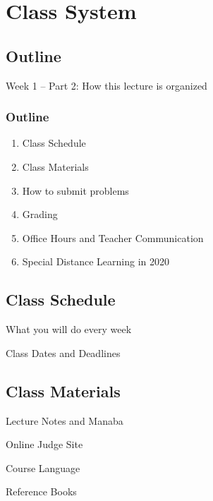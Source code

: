 
\section{Class System}
\subsection{Outline}

\begin{frame}
  \centering
  {\huge
    Week 1 -- Part 2: How this lecture is organized
  }
\end{frame}

\begin{frame}
  \frametitle{Outline}
  \begin{enumerate}
    \item Class Schedule
    \item Class Materials
    \item How to submit problems
    \item Grading
    \item Office Hours and Teacher Communication
    \item \alert{Special} Distance Learning in 2020
  \end{enumerate}
\end{frame}

\subsection{Class Schedule}
\begin{frame}{What you will do every week}
\end{frame}

\begin{frame}{Class Dates and Deadlines}
\end{frame}

\subsection{Class Materials}
\begin{frame}{Lecture Notes and Manaba}
\end{frame}
\begin{frame}{Online Judge Site}
\end{frame}
\begin{frame}{Course Language}
\end{frame}
\begin{frame}{Reference Books}
\end{frame}

